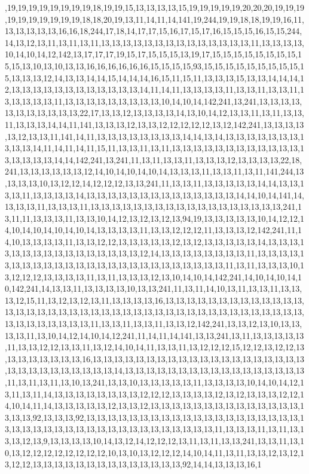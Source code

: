 ,19,19,19,19,19,19,19,19,18,19,19,15,13,13,13,13,15,19,19,19,19,19,20,20,20,19,19,19,19,19,19,19,19,19,19,18,18,20,19,13,11,14,11,14,141,19,244,19,19,18,18,19,19,16,11,13,13,13,13,13,16,16,18,244,17,18,14,17,17,15,16,17,15,17,16,15,15,15,16,15,15,244,14,13,12,13,11,13,11,13,11,13,13,13,13,13,13,13,13,13,13,13,13,13,13,11,13,13,13,13,10,14,10,14,12,142,13,17,17,17,19,15,17,15,15,15,13,19,17,15,15,15,15,15,15,15,15,15,15,13,10,13,10,13,13,16,16,16,16,16,16,15,15,15,15,93,15,15,15,15,15,15,15,15,15,15,13,13,13,12,14,13,13,14,14,15,14,14,14,16,15,11,15,11,13,13,13,15,13,13,14,14,14,12,13,13,13,13,13,13,13,13,13,13,13,13,14,11,14,11,13,13,13,13,11,13,13,11,13,13,11,13,13,13,13,13,11,13,13,13,13,13,13,13,13,13,10,14,10,14,142,241,13,241,13,13,13,13,13,13,13,13,13,13,13,22,17,13,13,12,13,13,13,13,14,13,10,14,12,13,13,11,13,11,13,13,11,13,13,13,14,14,11,141,13,13,13,12,13,13,12,12,12,12,12,13,12,142,241,13,13,13,13,13,12,13,13,11,141,14,11,13,13,13,13,13,13,13,13,14,14,13,14,13,13,13,13,13,13,13,13,13,13,14,11,14,11,14,11,15,11,13,13,11,13,11,13,13,13,13,13,13,13,13,13,13,13,13,13,13,13,13,13,14,14,142,241,13,241,11,13,11,13,13,11,13,13,13,12,13,13,13,13,22,18,241,13,13,13,13,13,13,12,14,10,14,10,14,10,14,13,13,13,11,13,13,11,13,11,141,244,13,13,13,13,10,13,12,12,14,12,12,12,13,13,241,11,13,13,11,13,13,13,13,13,14,14,13,13,13,13,11,13,13,13,13,14,13,13,13,13,13,13,13,13,13,13,13,13,13,13,14,14,10,14,141,14,13,13,13,11,13,13,13,11,13,13,13,13,13,13,13,13,13,13,13,13,13,13,13,13,13,13,241,13,11,11,13,13,13,11,13,13,10,14,12,13,12,13,12,13,94,19,13,13,13,13,13,10,14,12,12,14,10,14,10,14,10,14,10,14,13,13,13,13,11,13,13,12,12,12,11,13,13,13,12,142,241,11,14,10,13,13,13,13,11,13,13,12,12,13,13,13,13,13,12,13,12,13,13,13,13,13,14,13,13,13,13,13,13,13,13,13,13,13,13,13,13,13,13,12,14,13,13,13,13,13,13,13,13,11,13,13,13,13,13,13,13,13,13,13,13,13,13,13,13,13,13,13,13,13,13,13,13,13,13,11,13,11,13,13,13,10,13,12,12,12,13,13,13,13,11,13,11,13,13,13,12,13,10,14,10,14,142,241,14,10,14,10,14,10,142,241,14,13,13,11,13,13,13,13,10,13,13,241,11,13,11,14,10,13,11,13,13,11,13,13,13,12,15,11,13,12,13,12,13,11,13,13,13,13,16,13,13,13,13,13,13,13,13,13,13,13,13,13,13,13,13,13,13,13,13,13,13,13,13,13,13,13,13,13,13,13,13,13,13,13,13,13,13,13,13,13,13,13,13,13,13,13,13,13,11,13,13,11,13,13,11,13,13,12,142,241,13,13,12,13,10,13,13,13,13,11,13,10,14,12,14,10,14,12,241,11,14,11,14,141,13,13,241,13,11,13,13,13,13,13,11,13,13,12,12,13,13,11,13,12,14,10,14,11,13,13,11,13,12,12,12,15,12,12,13,12,12,13,13,13,13,13,13,13,13,16,13,13,13,13,13,13,13,13,13,13,13,13,13,13,13,13,13,13,13,13,13,13,13,13,13,13,13,13,13,13,14,13,13,13,13,13,13,13,13,13,13,13,13,13,13,13,13,13,11,13,11,13,11,13,10,13,241,13,13,10,13,13,13,13,13,11,13,13,13,13,10,14,10,14,12,13,11,13,11,14,13,13,13,13,13,13,13,13,12,12,12,13,13,13,13,12,13,12,13,13,13,12,12,14,10,14,11,14,13,13,13,13,13,12,13,13,12,13,13,13,13,13,13,13,13,13,13,13,13,13,13,13,13,13,92,13,13,13,92,13,13,13,13,13,13,13,13,13,13,13,13,13,13,13,13,13,13,13,13,13,13,13,13,13,13,13,13,13,13,13,13,13,13,13,13,13,13,13,13,11,13,13,13,11,13,11,13,13,13,12,13,9,13,13,13,13,10,14,13,12,14,12,12,12,13,11,13,11,13,13,241,13,13,11,13,10,13,12,12,12,12,12,12,12,12,10,13,10,13,12,12,12,14,10,14,11,13,11,13,13,12,13,12,13,12,12,13,13,13,13,13,13,13,13,13,13,13,13,13,13,92,14,14,13,13,13,16,1